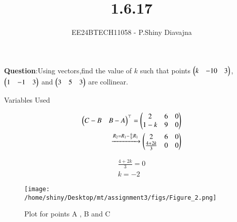 \documentclass[journal]{IEEEtran}
\begin{document}

\vspace{3cm}

\title{1.6.17}
\author{EE24BTECH11058 - P.Shiny Diavajna}
{\let\newpage\relax\maketitle}

\renewcommand{\thefigure}{\theenumi}
\renewcommand{\thetable}{\theenumi}
\setlength{\intextsep}{10pt} %


\renewcommand{\thetable}{\theenumi}

\textbf{Question}:Using vectors,find the value of $k$ such that points $\begin{pmatrix}k & -10 & 3\end{pmatrix}$, $\begin{pmatrix}1 & -1 & 3\end{pmatrix}$ and $\begin{pmatrix}3 & 5 & 3\end{pmatrix}$ are collinear.\\

\solution 
    
\begin{table}[h!]    
     \centering
     
     \caption{Variables Used}
     \label{tab1.6.17.1}
   \end{table}

   \begin{align*}
     \begin{pmatrix}C-B & B-A\end{pmatrix}^\top =\begin{pmatrix}2 & 6 & 0 \\ 1-k & 9 & 0\end{pmatrix}\\
     \xrightarrow{R_2=R_1-\frac{6}{9}R_1} \begin{pmatrix}2 & 6 & 0 \\ \frac{4+2k}{3} & 0 & 0\end{pmatrix}\\ 
   \end{align*} 

   \begin{align*}
     \frac{4+2k}{3} = 0 \\
        k=-2
    \end{align*}


   \begin{figure}[h!]
    \centering
    \texttt{[image: /home/shiny/Desktop/mt/assignment3/figs/Figure\_2.png]}
    \caption{Plot for points A , B and C}
   \end{figure}
\end{document}
